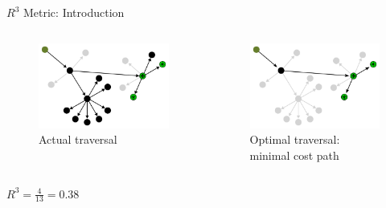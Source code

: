 \begin{frame}{$R^{3}$ Metric: Introduction}
  \centering
  \begin{columns}[c]
    \begin{figure}
      \includegraphics[width=\linewidth]{images/r3-metric-bad-traversal.pdf}
      \caption{\small Actual traversal}
    \end{figure}

    \begin{figure}
      \includegraphics[width=\linewidth]{images/r3-metric-good-traversal.pdf}
      \caption{\small Optimal traversal: minimal cost path}
    \end{figure}
  \end{columns}

  \vspace{1em}
  \small $ R^{3} = \frac{4}{13} = 0.38$
\end{frame}